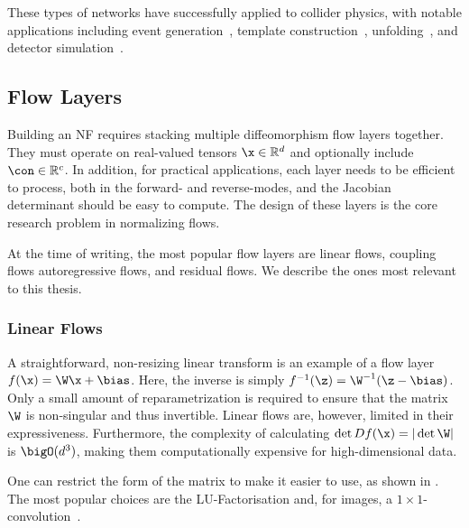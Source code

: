 These types of networks have successfully applied to collider physics, with notable applications including event generation~\cite{EventGen}, template construction~\cite{ANODE, CATHODE, CURTAINs}, unfolding~\cite{PartonsAndBack}, and detector simulation~\cite{CaloFlow, CaloFlow2}.

\subsection{Flow Layers}

Building an NF requires stacking multiple diffeomorphism flow layers together.
They must operate on real-valued tensors $\x \in \mathbb{R}^d$ and optionally include $\con \in \mathbb{R}^c$.
In addition, for practical applications, each layer needs to be efficient to process, both in the forward- and reverse-modes, and the Jacobian determinant should be easy to compute.
The design of these layers is the core research problem in normalizing flows.

At the time of writing, the most popular flow layers are linear flows, coupling flows autoregressive flows, and residual flows.
We describe the ones most relevant to this thesis.

\subsubsection{Linear Flows}

A straightforward, non-resizing linear transform is an example of a flow layer $f(\x) = \W\x + \bias$.
Here, the inverse is simply $f^{-1}(\z) = \W^{-1}(\z - \bias)$.
Only a small amount of reparametrization is required to ensure that the matrix $\W$ is non-singular and thus invertible.
Linear flows are, however, limited in their expressiveness.
Furthermore, the complexity of calculating $\det D f(\x) = |\det \W|$ is $\bigO(d^3)$, making them computationally expensive for high-dimensional data.

One can restrict the form of the matrix to make it easier to use, as shown in .
The most popular choices are the LU-Factorisation and, for images, a $1\times1$-convolution~\cite{GlowGenerativeFlow}.


